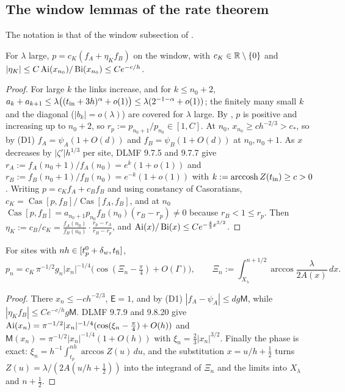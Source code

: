 \subsection{The window lemmas of the rate theorem}\label{app:ratewindow}

The notation is that of the window subsection of .

\begin{lemma}[Connection]\label{lem:K}
For $\lambda$ large, $p=c_K(f_A+\eta_Kf_B)$ on the window, with $c_K\in\mathbb{R}\setminus\{0\}$ and
$|\eta_K|\le C\operatorname{Ai}(x_{n_0})/\operatorname{Bi}(x_{n_0})\le Ce^{-c/h}$.
\end{lemma}

\begin{proof}
For large $k$ the links increase, and for $k\le n_0+2$,
$a_k+a_{k+1}\le\lambda\bigl((t_{\rm in}+3h)^\alpha+o(1)\bigr)\le\lambda(2^{-1-\alpha}+o(1))$; the finitely many
small $k$ and the diagonal ($|b_k|=o(\lambda)$) are covered for $\lambda$ large. By
, $p$ is positive and increasing up to $n_0+2$, so
$r_p:=p_{n_0+1}/p_{n_0}\in[1,C]$. At $n_0$, $x_{n_0}\ge ch^{-2/3}>c_*$, so by (D1)
$f_A=\psi_A(1+O(d))$ and $f_B=\psi_B(1+O(d))$ at $n_0,n_0+1$. As $x$ decreases by
$|\zeta'|h^{1/3}$ per site, DLMF 9.7.5 and 9.7.7 give $r_A:=f_A(n_0+1)/f_A(n_0)=e^{k}(1+o(1))$ and
$r_B:=f_B(n_0+1)/f_B(n_0)=e^{-k}(1+o(1))$ with $k:=\operatorname{arccosh} Z(t_{\rm in})\ge c>0$. Writing
$p=c_Kf_A+c_Bf_B$ and using constancy of Casoratians,
$c_K=\operatorname{Cas}[p,f_B]/\operatorname{Cas}[f_A,f_B]$, and at $n_0$
$\operatorname{Cas}[p,f_B]=a_{n_0+1}p_{n_0}f_B(n_0)(r_B-r_p)\neq0$ because $r_B<1\le r_p$. Then
$\eta_K:=c_B/c_K=\frac{f_A(n_0)}{f_B(n_0)}\cdot\frac{r_p-r_A}{r_B-r_p}$, and
$\operatorname{Ai}(x)/\operatorname{Bi}(x)\le Ce^{-\frac43x^{3/2}}$.
\end{proof}

\begin{lemma}\label{lem:O}
For sites with $nh\in[t_p^0+\delta_w,t_{\rm fi}]$,
\[
  p_n=c_K\,\pi^{-1/2}g_n|x_n|^{-1/4}\bigl(\cos(\Xi_n-\tfrac\pi4)+O(\Gamma)\bigr),\qquad
  \Xi_n:=\int_{X_\lambda}^{n+1/2}\arccos\frac{\lambda}{2A(x)}\,dx .
\]
\end{lemma}

\begin{proof}
There $x_n\le-ch^{-2/3}$, $\mathsf E=1$, and by (D1) $|f_A-\psi_A|\le dg\mathsf M$, while
$|\eta_Kf_B|\le Ce^{-c/h}g\mathsf M$. DLMF 9.7.9 and 9.8.20 give
$\operatorname{Ai}(x_n)=\pi^{-1/2}|x_n|^{-1/4}(\cos(\xi_n-\frac\pi4)+O(h))$ and $\mathsf M(x_n)=\pi^{-1/2}|x_n|^{-1/4}(1+O(h))$
with $\xi_n=\frac23|x_n|^{3/2}$. Finally the phase is exact: $\xi_n=h^{-1}\int_{t_p}^{nh}\arccos Z(u)\,du$,
and the substitution $x=u/h+\frac12$ turns $Z(u)=\lambda/(2A(u/h+\frac12))$ into the integrand of
$\Xi_n$ and the limits into $X_\lambda$ and $n+\frac12$.
\end{proof}

